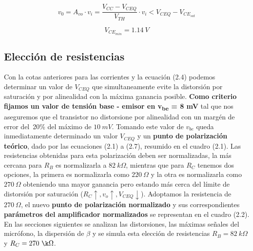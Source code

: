 \documentclass[a4paper, 10pt, spanish]{article}
\numberwithin{equation}{section}
\numberwithin{table}{section}
\begin{document}
\begin{equation}
v_0 = A_{vo}\cdot v_i = \frac{V_{CC} - V_{CEQ}}{V_{TH}} \cdot v_i < V_{CEQ} - V_{CE}_{sat} \nonumber
\end{equation}

\begin{equation}
V_{CE}_{min} = 1.14\ V \nonumber
\end{equation}


\subsection{Elección de resistencias}
Con la cotas anteriores para las corrientes y la ecuación (2.4) podemos determinar un valor de $V_{CEQ}$ que simultaneamente evite la distorsión por saturación y por alinealidad con la máxima ganancia posible.\textbf{ Como criterio fijamos un valor de tensión base - emisor en v\textsubscript{be} = 8 mV} tal que nos aseguremos que el transistor no distorsione por alinealidad con un margén de error del\ 20\% del máximo de $10\ mV$. Tomando este valor de $v_{be}$ queda inmediatamente determinado un valor $V_{CEQ}$ y un \textbf{punto de polarización teórico}, dado por las ecuaciones (2.1) a (2.7), resumido en el cuadro (2.1). Las resistencias obtenidas para esta polarización deben ser normalizadas, la más cercana para $R_B$ es normalizarla a $82\ k\Omega$, mientras que para $R_C$ tenemos dos opciones, la primera es normalizarla como $220\ \Omega$ y la otra es normalizarla como $270\ \Omega$ obteniendo una mayor ganancia pero estando más cerca del límite de distorsión por saturación ($R_C \uparrow,v_o \uparrow  ,V_{CEQ} \downarrow$). Adoptamos la resistencia de $270\ \Omega$, el nuevo \textbf{punto de polarización normalizado} y sus correspondientes \textbf{parámetros del amplificador normalizados} se representan en el cuadro (2.2). En las secciones siguientes se analizan las distorsiones, las máximas señales del micrófono, la dispersión de $\beta$ y se simula esta elección de resistencias $R_B = 82\ k\Omega$ y $R_C = 270\ \k\Omega$. 
\end{document}
